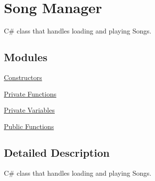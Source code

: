 \hypertarget{group___doc_s_m}{}\section{Song Manager}
\label{group___doc_s_m}


C\# class that handles loading and playing Songs.  


\subsection*{Modules}
\begin{DoxyCompactItemize}
\item 
\hyperlink{group___s_m_construct}{Constructors}
\item 
\hyperlink{group___s_m_priv_func}{Private Functions}
\item 
\hyperlink{group___s_m_priv_var}{Private Variables}
\item 
\hyperlink{group___s_m_pub_func}{Public Functions}
\end{DoxyCompactItemize}


\subsection{Detailed Description}
C\# class that handles loading and playing Songs. 

